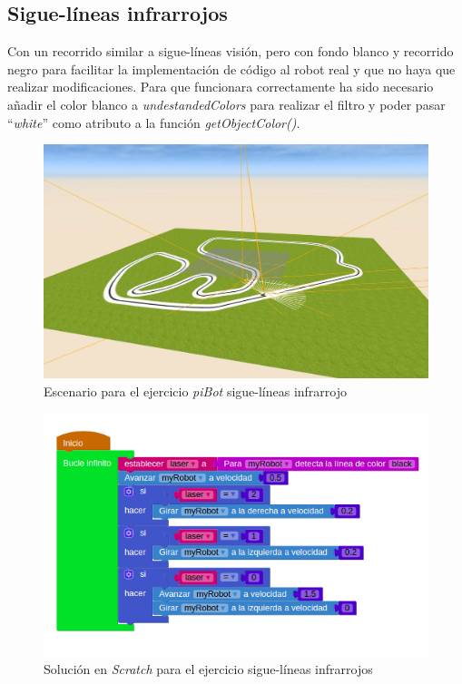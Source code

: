 \subsection{Sigue-líneas infrarrojos}
    Con un recorrido similar a sigue-líneas visión, pero con fondo blanco y recorrido negro para facilitar la implementación de código al robot real y que no haya que realizar modificaciones. Para que funcionara correctamente ha sido necesario añadir el color blanco a \textit{undestandedColors} para realizar el filtro y poder pasar ``\textit{white}'' como atributo a la función \textit{getObjectColor()}.
    
    \begin{figure}[H]
    \centering
    \includegraphics[scale=0.4]{img/siguelineas_ir.JPG}
    \caption{Escenario para el ejercicio \textit{piBot} sigue-líneas infrarrojo} \label{fig:siguelineasIR}
    \end{figure}
    
           \begin{figure}[H]
    \centering
    \includegraphics[scale=0.5]{img/siguelineaIRcodigo.png}
    \caption{Solución en \textit{Scratch} para el ejercicio sigue-líneas infrarrojos} 
    \label{fig:irSolution}
    \end{figure}
    
